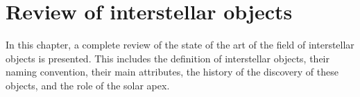 \chapter{Review of interstellar objects}

In this chapter, a complete review of the state of the art of the field of
interstellar objects is presented. This includes the definition of interstellar
objects, their naming convention, their main attributes, the history of the
discovery of these objects, and the role of the solar apex.





